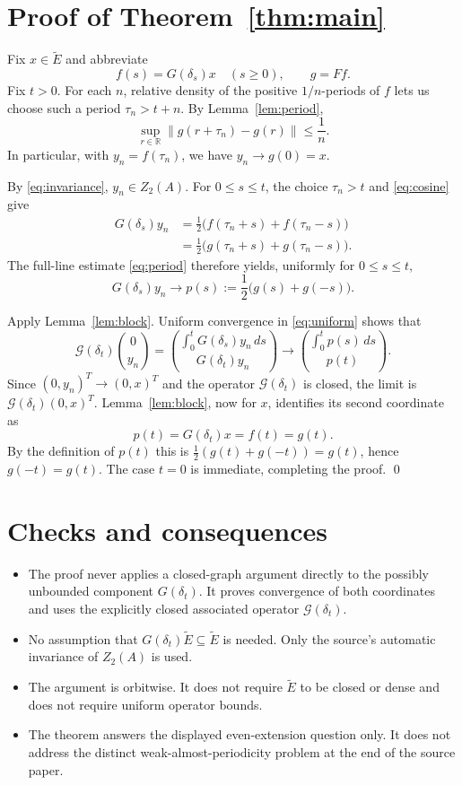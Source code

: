 \documentclass[11pt]{article}
\newcommand{\R}{\mathbb R}
\newcommand{\Eap}{\widetilde E}
\newcommand{\Gop}{G}
\newcommand{\GG}{\mathcal G}
\begin{document}
\section{Proof of Theorem~\ref{thm:main}}

Fix $x\in\Eap$ and abbreviate
\[
 f(s)=\Gop(\delta_s)x\quad(s\geq0),\qquad g=Ff.
\]
Fix $t>0$.  For each $n$, relative density of the positive
$1/n$-periods of $f$ lets us choose such a period $\tau_n>t+n$.  By
Lemma~\ref{lem:period},
\begin{equation}
 \sup_{r\in\R}\|g(r+\tau_n)-g(r)\|\leq\frac1n.       \label{eq:period}
\end{equation}
In particular, with $y_n=f(\tau_n)$, we have $y_n\to g(0)=x$.

By \eqref{eq:invariance}, $y_n\in Z_2(A)$.  For $0\leq s\leq t$, the
choice $\tau_n>t$ and \eqref{eq:cosine} give
\begin{align*}
 \Gop(\delta_s)y_n
 &=\frac12\bigl(f(\tau_n+s)+f(\tau_n-s)\bigr)\\
 &=\frac12\bigl(g(\tau_n+s)+g(\tau_n-s)\bigr).
\end{align*}
The full-line estimate \eqref{eq:period} therefore yields, uniformly for
$0\leq s\leq t$,
\begin{equation}
 \Gop(\delta_s)y_n\longrightarrow
 p(s):=\frac12\bigl(g(s)+g(-s)\bigr).                 \label{eq:uniform}
\end{equation}

Apply Lemma~\ref{lem:block}.  Uniform convergence in \eqref{eq:uniform}
shows that
\[
 \GG(\delta_t)\binom{0}{y_n}
 =\binom{\int_0^t\Gop(\delta_s)y_n\,ds}
             {\Gop(\delta_t)y_n}
 \longrightarrow
 \binom{\int_0^tp(s)\,ds}{p(t)}.
\]
Since $(0,y_n)^T\to(0,x)^T$ and the operator $\GG(\delta_t)$ is closed,
the limit is $\GG(\delta_t)(0,x)^T$.  Lemma~\ref{lem:block}, now for $x$,
identifies its second coordinate as
\[
 p(t)=\Gop(\delta_t)x=f(t)=g(t).
\]
By the definition of $p(t)$ this is
$\tfrac12(g(t)+g(-t))=g(t)$, hence $g(-t)=g(t)$.  The case $t=0$ is
immediate, completing the proof. \qed

\section{Checks and consequences}

\begin{itemize}[leftmargin=2em]
\item The proof never applies a closed-graph argument directly to the
possibly unbounded component $\Gop(\delta_t)$.  It proves convergence of both
coordinates and uses the explicitly closed associated operator
$\GG(\delta_t)$.
\item No assumption that $\Gop(\delta_t)\Eap\subseteq\Eap$ is needed.  Only
the source's automatic invariance of $Z_2(A)$ is used.
\item The argument is orbitwise.  It does not require $\Eap$ to be closed or
dense and does not require uniform operator bounds.
\item The theorem answers the displayed even-extension question only.  It
does not address the distinct weak-almost-periodicity problem at the end of
the source paper.
\end{itemize}
\end{document}
